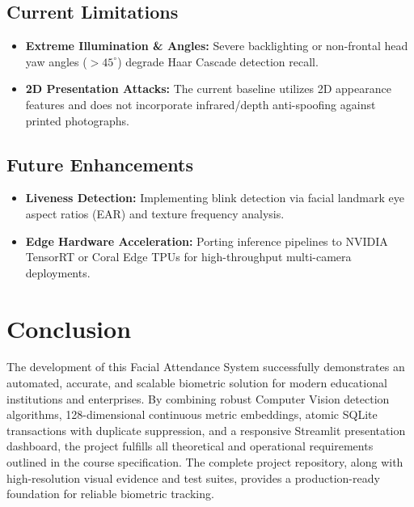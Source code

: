 \documentclass[12pt,a4paper]{article}
\begin{document}
\subsection{Current Limitations}
\begin{itemize}
    \item \textbf{Extreme Illumination \& Angles:} Severe backlighting or non-frontal head yaw angles ($> 45^\circ$) degrade Haar Cascade detection recall.
    \item \textbf{2D Presentation Attacks:} The current baseline utilizes 2D appearance features and does not incorporate infrared/depth anti-spoofing against printed photographs.
\end{itemize}

\subsection{Future Enhancements}
\begin{itemize}
    \item \textbf{Liveness Detection:} Implementing blink detection via facial landmark eye aspect ratios (EAR) and texture frequency analysis.
    \item \textbf{Edge Hardware Acceleration:} Porting inference pipelines to NVIDIA TensorRT or Coral Edge TPUs for high-throughput multi-camera deployments.
\end{itemize}

\newpage

\section{Conclusion}
\label{sec:conclusion}

The development of this Facial Attendance System successfully demonstrates an automated, accurate, and scalable biometric solution for modern educational institutions and enterprises. By combining robust Computer Vision detection algorithms, 128-dimensional continuous metric embeddings, atomic SQLite transactions with duplicate suppression, and a responsive Streamlit presentation dashboard, the project fulfills all theoretical and operational requirements outlined in the course specification. The complete project repository, along with high-resolution visual evidence and test suites, provides a production-ready foundation for reliable biometric tracking.
\end{document}

